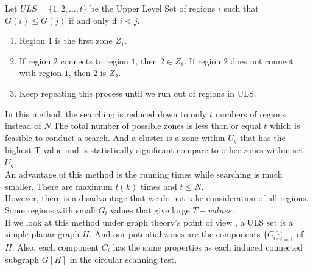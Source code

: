 \documentclass[12pt]{article}
\begin{document}
\begin{enumerate}
				Let $ULS= \{1,2,\dots,t\}$ be the Upper Level Set of regions $i$ such that $G(i) \leq G(j)$ if and only if $i < j$.  
				\begin{enumerate}
					\item Region $1$ is the first zone $Z_1$. 
					\item If region $2$ connects to region $1$, then $2 \in Z_1$. If region $2$ does not connect with region $1$, then $2$ is $Z_2$. 
					\item Keep repeating this process until we run out of regions in ULS. \\   
				\end{enumerate}
			 In this method, the searching is reduced down to only $t$ numbers of regions instead of $N$.The total number of possible zones is less than or equal $t$ which is feasible to conduct a search. And a cluster is a zone within $U_g$ that has the highest T-value and is statistically significant compare to other zones within set $U_g$.\\ 
		An advantage of this method is the running times while searching is much smaller. There are maximum $t(k)$ times and $t \leq N$. \\	
		However, there is a disadvantage that we do not take consideration of all regions. Some regions with small $G_i$ values that give large $T-values$. \\
		
		If we look at this method under graph theory's point of view , a ULS set is a simple planar graph $H$. And our potential zones are the components $\{C_i\}_{i=1}^{t}$ of $H$. Also, each component $C_i$ has the same properties as each induced connected subgraph $G[H]$ in the circular scanning test. \\  
				

\end{enumerate}
\end{document}
